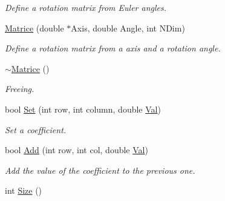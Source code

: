 \begin{DoxyCompactItemize}
\begin{DoxyCompactList}\small\item\em Define a rotation matrix from Euler angles. \end{DoxyCompactList}\item 
\hyperlink{classMatrice_a9acb38f7eeb5f9c61aa9f79928912e7f}{Matrice} (double $\ast$Axis, double Angle, int N\+Dim)\hypertarget{classMatrice_a9acb38f7eeb5f9c61aa9f79928912e7f}{}\label{classMatrice_a9acb38f7eeb5f9c61aa9f79928912e7f}

\begin{DoxyCompactList}\small\item\em Define a rotation matrix from a axis and a rotation angle. \end{DoxyCompactList}\item 
\hyperlink{classMatrice_a7c102b4f9b38e5975567e561581f38de}{$\sim$\+Matrice} ()\hypertarget{classMatrice_a7c102b4f9b38e5975567e561581f38de}{}\label{classMatrice_a7c102b4f9b38e5975567e561581f38de}

\begin{DoxyCompactList}\small\item\em Freeing. \end{DoxyCompactList}\item 
bool \hyperlink{classMatrice_a3caf89cd6f9ccd16fcdc6a6c57039c2f}{Set} (int row, int column, double \hyperlink{classMatrice_a2a233d9af97c320a1b372ededf056886}{Val})\hypertarget{classMatrice_a3caf89cd6f9ccd16fcdc6a6c57039c2f}{}\label{classMatrice_a3caf89cd6f9ccd16fcdc6a6c57039c2f}

\begin{DoxyCompactList}\small\item\em Set a coefficient. \end{DoxyCompactList}\item 
bool \hyperlink{classMatrice_aa0c2a276b9a17b75e9d689bbda62b1b5}{Add} (int row, int col, double \hyperlink{classMatrice_a2a233d9af97c320a1b372ededf056886}{Val})\hypertarget{classMatrice_aa0c2a276b9a17b75e9d689bbda62b1b5}{}\label{classMatrice_aa0c2a276b9a17b75e9d689bbda62b1b5}

\begin{DoxyCompactList}\small\item\em Add the value of the coefficient to the previous one. \end{DoxyCompactList}\item 
int \hyperlink{classMatrice_af40990b9bd3d70d30e8ce7cdda1ad56f}{Size} ()\hypertarget{classMatrice_af40990b9bd3d70d30e8ce7cdda1ad56f}{}\label{classMatrice_af40990b9bd3d70d30e8ce7cdda1ad56f}


\end{DoxyCompactItemize}
